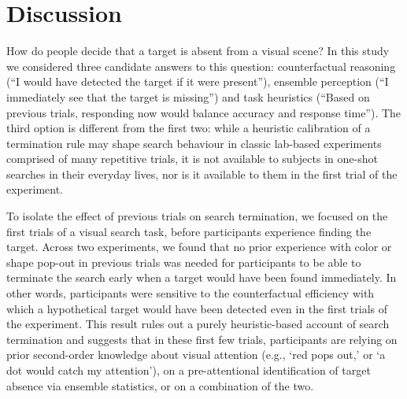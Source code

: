 \documentclass[12pt,twoside]{reedthesis}
\begin{document}
\hypertarget{discussion}{%
\section{Discussion}\label{discussion}}

How do people decide that a target is absent from a visual scene? In this study we considered three candidate answers to this question: counterfactual reasoning (``I would have detected the target if it were present''), ensemble perception (``I immediately see that the target is missing'') and task heuristics (``Based on previous trials, responding now would balance accuracy and response time''). The third option is different from the first two: while a heuristic calibration of a termination rule may shape search behaviour in classic lab-based experiments comprised of many repetitive trials, it is not available to subjects in one-shot searches in their everyday lives, nor is it available to them in the first trial of the experiment.

To isolate the effect of previous trials on search termination, we focused on the first trials of a visual search task, before participants experience finding the target. Across two experiments, we found that no prior experience with color or shape pop-out in previous trials was needed for participants to be able to terminate the search early when a target would have been found immediately. In other words, participants were sensitive to the counterfactual efficiency with which a hypothetical target would have been detected even in the first trials of the experiment. This result rules out a purely heuristic-based account of search termination and suggests that in these first few trials, participants are relying on prior second-order knowledge about visual attention (e.g., `red pops out,' or `a dot would catch my attention'), on a pre-attentional identification of target absence via ensemble statistics, or on a combination of the two.
\end{document}
